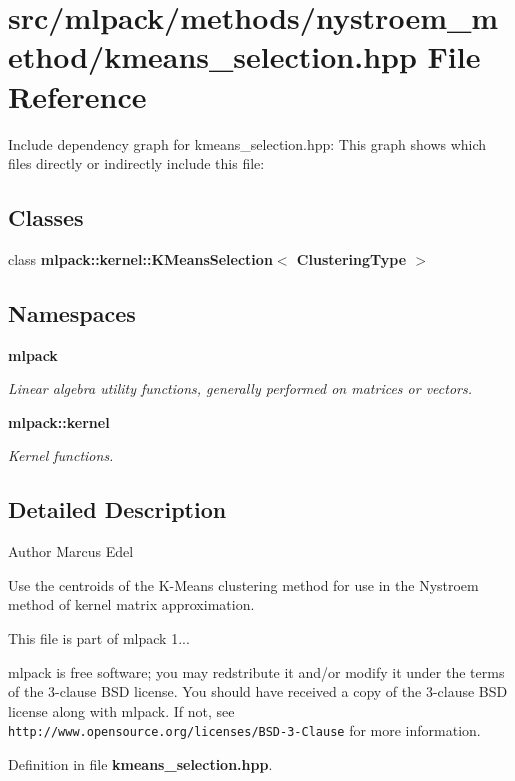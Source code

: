 \section{src/mlpack/methods/nystroem\-\_\-method/kmeans\-\_\-selection.hpp File Reference}
\label{kmeans__selection_8hpp}
Include dependency graph for kmeans\-\_\-selection.\-hpp\-:
This graph shows which files directly or indirectly include this file\-:
\subsection*{Classes}
\begin{DoxyCompactItemize}
\item 
class {\bf mlpack\-::kernel\-::\-K\-Means\-Selection$<$ Clustering\-Type $>$}
\end{DoxyCompactItemize}
\subsection*{Namespaces}
\begin{DoxyCompactItemize}
\item 
{\bf mlpack}
\begin{DoxyCompactList}\small\item\em Linear algebra utility functions, generally performed on matrices or vectors. \end{DoxyCompactList}\item 
{\bf mlpack\-::kernel}
\begin{DoxyCompactList}\small\item\em Kernel functions. \end{DoxyCompactList}\end{DoxyCompactItemize}


\subsection{Detailed Description}
\begin{DoxyAuthor}{Author}
Marcus Edel
\end{DoxyAuthor}
Use the centroids of the K-\/\-Means clustering method for use in the Nystroem method of kernel matrix approximation.

This file is part of mlpack 1...

mlpack is free software; you may redstribute it and/or modify it under the terms of the 3-\/clause B\-S\-D license. You should have received a copy of the 3-\/clause B\-S\-D license along with mlpack. If not, see {\tt http\-://www.\-opensource.\-org/licenses/\-B\-S\-D-\/3-\/\-Clause} for more information. 

Definition in file {\bf kmeans\-\_\-selection.\-hpp}.


